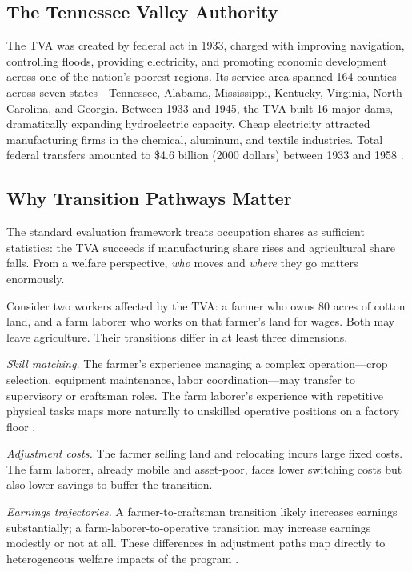 \documentclass[12pt]{article}
\begin{document}
\subsection{The Tennessee Valley Authority}

The TVA was created by federal act in 1933, charged with improving navigation, controlling floods, providing electricity, and promoting economic development across one of the nation's poorest regions. Its service area spanned 164 counties across seven states---Tennessee, Alabama, Mississippi, Kentucky, Virginia, North Carolina, and Georgia. Between 1933 and 1945, the TVA built 16 major dams, dramatically expanding hydroelectric capacity. Cheap electricity attracted manufacturing firms in the chemical, aluminum, and textile industries. Total federal transfers amounted to \$4.6 billion (2000 dollars) between 1933 and 1958 \citep{kline2014}.

\subsection{Why Transition Pathways Matter}

The standard evaluation framework treats occupation shares as sufficient statistics: the TVA succeeds if manufacturing share rises and agricultural share falls. From a welfare perspective, \textit{who} moves and \textit{where} they go matters enormously.

Consider two workers affected by the TVA: a farmer who owns 80 acres of cotton land, and a farm laborer who works on that farmer's land for wages. Both may leave agriculture. Their transitions differ in at least three dimensions.

\textit{Skill matching.} The farmer's experience managing a complex operation---crop selection, equipment maintenance, labor coordination---may transfer to supervisory or craftsman roles. The farm laborer's experience with repetitive physical tasks maps more naturally to unskilled operative positions on a factory floor \citep{autor2003, deming2020}.

\textit{Adjustment costs.} The farmer selling land and relocating incurs large fixed costs. The farm laborer, already mobile and asset-poor, faces lower switching costs but also lower savings to buffer the transition.

\textit{Earnings trajectories.} A farmer-to-craftsman transition likely increases earnings substantially; a farm-laborer-to-operative transition may increase earnings modestly or not at all. These differences in adjustment paths map directly to heterogeneous welfare impacts of the program \citep{chetty2014}.
\end{document}
